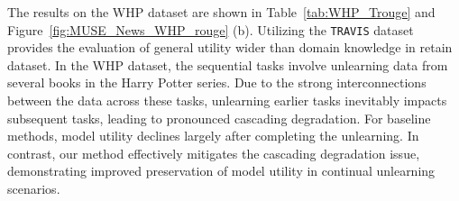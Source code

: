 \documentclass{article}
\theoremstyle{plain}
\theoremstyle{definition}
\theoremstyle{remark}
\begin{document}
\begin{table}[t!]
	\centering
	\caption{Final model utility metrics and average unlearning performance metrics over three tasks on the WHP dataset.}
	\label{tab:WHP_Trouge}
\end{table}

The results on the WHP dataset are shown in Table~\ref{tab:WHP_Trouge} and Figure~\ref{fig:MUSE_News_WHP_rouge} (b).
Utilizing the \texttt{TRAVIS} dataset provides the evaluation of general utility wider than domain knowledge in retain dataset.
In the WHP dataset, the sequential tasks involve unlearning data from several books in the Harry Potter series. Due to the strong interconnections between the data across these tasks, unlearning earlier tasks inevitably impacts subsequent tasks, leading to pronounced cascading degradation.
For baseline methods, model utility declines largely after completing the unlearning. 
In contrast, our method effectively mitigates the cascading degradation issue, demonstrating improved preservation of model utility in continual unlearning scenarios.
\end{document}
